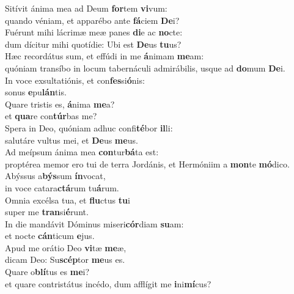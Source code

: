 \evenverse Sitívit ánima mea ad Deum \textbf{for}tem \textbf{vi}vum:~\*\\
\evenverse quando véniam, et apparébo ante \textbf{fá}ciem \textbf{De}i?\\
\oddverse Fuérunt mihi lácrimæ meæ panes \textbf{di}e ac \textbf{no}cte:~\*\\
\oddverse dum dícitur mihi quotídie: Ubi est \textbf{De}us \textbf{tu}us?\\
\evenverse Hæc recordátus sum, et effúdi in me \textbf{á}nimam \textbf{me}am:~\*\\
\evenverse quóniam transíbo in locum tabernáculi admirábilis, usque ad \textbf{do}mum \textbf{De}i.\\
\oddverse In voce exsultatiónis, et con\textbf{fes}si\textbf{ó}nis:~\*\\
\oddverse sonus \textbf{e}pu\textbf{lán}tis.\\
\evenverse Quare tristis es, \textbf{á}nima \textbf{me}a?~\*\\
\evenverse et \textbf{qua}re con\textbf{túr}bas me?\\
\oddverse Spera in Deo, quóniam adhuc confi\textbf{té}bor \textbf{il}li:~\*\\
\oddverse salutáre vultus mei, et \textbf{De}us \textbf{me}us.\\
\evenverse Ad meípsum ánima mea \textbf{con}tur\textbf{bá}ta est:~\*\\
\evenverse proptérea memor ero tui de terra Jordánis, et Hermóniim a \textbf{mon}te \textbf{mó}dico.\\
\oddverse Abýssus a\textbf{býs}sum \textbf{ín}vocat,~\*\\
\oddverse in voce catara\textbf{ctá}rum tu\textbf{á}rum.\\
\evenverse Omnia excélsa tua, et \textbf{flu}ctus \textbf{tu}i~\*\\
\evenverse super me \textbf{tran}si\textbf{é}runt.\\
\oddverse In die mandávit Dóminus miseri\textbf{cór}diam \textbf{su}am:~\*\\
\oddverse et nocte \textbf{cán}ticum \textbf{e}jus.\\
\evenverse Apud me orátio Deo \textbf{vi}tæ \textbf{me}æ,~\*\\
\evenverse dicam Deo: Su\textbf{scép}tor \textbf{me}us es.\\
\oddverse Quare o\textbf{blí}tus es \textbf{me}i?~\*\\
\oddverse et quare contristátus incédo, dum afflígit me \textbf{i}ni\textbf{mí}cus?\\
